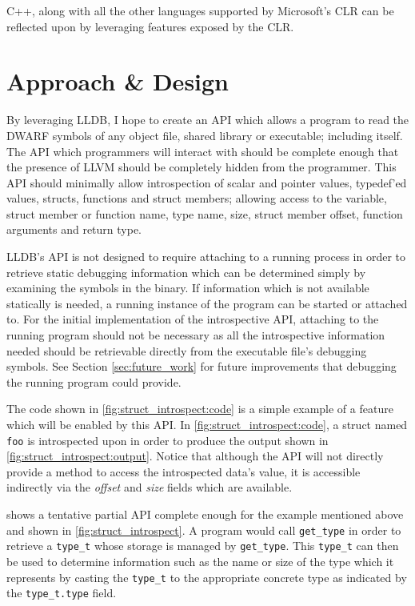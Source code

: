 \documentclass[twocolumn,draft]{article}
\begin{document}
C++, along with all the other languages supported by Microsoft's CLR can be
reflected upon by leveraging features exposed by the CLR. \cite{clr-cpp}

\section{Approach \& Design}
By leveraging LLDB, I hope to create an API which allows a program to read the
DWARF symbols of any object file, shared library or executable; including
itself. The API which programmers will interact with should be complete enough
that the presence of LLVM should be completely hidden from the programmer. This
API should minimally allow introspection of scalar and pointer values,
typedef'ed values, structs, functions and struct members; allowing access to the
variable, struct member or function name, type name, size, struct member offset,
function arguments and return type.

LLDB's API is not designed to require attaching to a running process in order to
retrieve static debugging information which can be determined simply by
examining the symbols in the binary. If information which is not available
statically is needed, a running instance of the program can be started or
attached to. For the initial implementation of the introspective API, attaching
to the running program should not be necessary as all the introspective
information needed should be retrievable directly from the executable file's
debugging symbols. See Section \ref{sec:future_work} for future improvements
that debugging the running program could provide.

The code shown in \cref{fig:struct_introspect:code} is a simple example of a
feature which will be enabled by this API. In \cref{fig:struct_introspect:code},
a struct named \texttt{foo} is introspected upon in order to produce the output
shown in \cref{fig:struct_introspect:output}. Notice that although the API will
not directly provide a method to access the introspected data's value, it is
accessible indirectly via the \emph{offset} and \emph{size} fields which are
available.

 shows a tentative partial API complete enough for
the example mentioned above and shown in \vref{fig:struct_introspect}. A program
would call \texttt{get\_type} in order to retrieve a \texttt{type\_t} whose
storage is managed by \texttt{get\_type}. This \texttt{type\_t} can then be used
to determine information such as the name or size of the type which it
represents by casting the \texttt{type\_t} to the appropriate concrete type as
indicated by the \texttt{type\_t.type} field.
\end{document}

